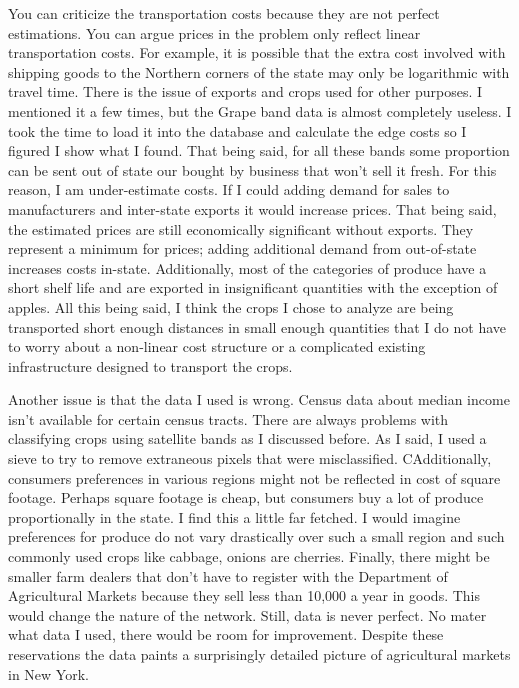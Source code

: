 \documentclass{report}
\begin{document}
You can criticize the transportation costs because they are not perfect estimations. You can argue prices in the problem only reflect linear transportation costs. For example, it is possible that the extra cost involved with shipping goods to the Northern corners of the state may only be logarithmic with travel time. There is the issue of exports and crops used for other purposes. I mentioned it a few times, but the Grape band data is almost completely useless. I took the time to load it into the database and calculate the edge costs so I figured I show what I found. That being said, for all these bands some proportion can be sent out of state our bought by business that won't sell it fresh. For this reason, I am under-estimate costs. If I could adding demand for sales to manufacturers and inter-state exports it would increase prices. That being said, the estimated prices are still economically significant without exports. They represent a minimum for prices; adding additional demand from out-of-state increases costs in-state. Additionally, most of the categories of produce have a short shelf life and are exported in insignificant quantities with the exception of apples. All this being said, I think the crops I chose to analyze are being transported short enough distances in small enough quantities that I do not have to worry about a non-linear cost structure or a complicated existing infrastructure designed to transport the crops.

Another issue is that the data I used is wrong. Census data about median income isn't available for certain census tracts. There are always problems with classifying crops using satellite bands as I discussed before. As I said, I used a sieve to try to remove extraneous pixels that were misclassified. CAdditionally, consumers preferences in various regions might not be reflected in cost of square footage. Perhaps square footage is cheap, but consumers buy a lot of produce proportionally in the state. I find this a little far fetched. I would imagine preferences for produce do not vary drastically over such a small region and such commonly used crops like cabbage, onions are cherries. Finally, there might be smaller farm dealers that don't have to register with the Department of Agricultural Markets because they sell less than 10,000 a year in goods. This would change the nature of the network. Still, data is never perfect. No mater what data I used, there would be room for improvement. Despite these reservations the data paints a surprisingly detailed picture of agricultural markets in New York. 
\end{document}

